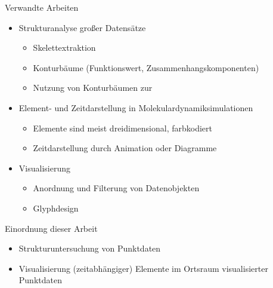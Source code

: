 \documentclass[10pt]{beamer}
\begin{document}
%
%
\begin{frame}{Verwandte Arbeiten}
	\begin{itemize}
		\item Strukturanalyse großer Datensätze
		\begin{itemize}
			\item Skelettextraktion
			\item Konturbäume (Funktionswert, Zusammenhangskomponenten)
			\item Nutzung von Konturbäumen zur 
		\end{itemize}
		\item Element- und Zeitdarstellung in Molekulardynamiksimulationen
		\begin{itemize}
			\item Elemente sind meist dreidimensional, farbkodiert
			\item Zeitdarstellung durch Animation oder Diagramme
		\end{itemize}
		\item Visualisierung
		\begin{itemize}
			\item Anordnung und Filterung von Datenobjekten
			\item Glyphdesign
		\end{itemize}
	\end{itemize}
\end{frame}

\begin{frame}{Einordnung dieser Arbeit}
	\begin{itemize}
		\item Strukturuntersuchung von Punktdaten
		\item Visualisierung (zeitabhängiger) Elemente im Ortsraum visualisierter Punktdaten
	\end{itemize}
\end{frame}
\end{document}
